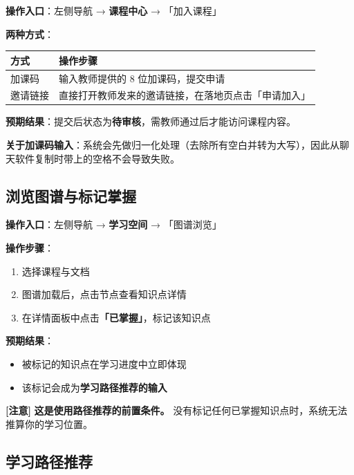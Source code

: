 \documentclass[UTF8,a4paper,11pt]{ctexrep}
\newcommand{\warnmark}{\textcolor{todobar}{\textbf{[注意]}}}
\begin{document}
\textbf{操作入口}：左侧导航 → \textbf{课程中心} → 「加入课程」

\textbf{两种方式}：

\begin{center}
\small
\begin{tabularx}{\linewidth}{@{}XX@{}}
\toprule
方式 & 操作步骤 \\
\midrule
加课码 & 输入教师提供的 8 位加课码，提交申请 \\
邀请链接 & 直接打开教师发来的邀请链接，在落地页点击「申请加入」 \\
\bottomrule
\end{tabularx}
\end{center}
\textbf{预期结果}：提交后状态为\textbf{待审核}，需教师通过后才能访问课程内容。

\begin{notebox}
\textbf{关于加课码输入}：系统会先做归一化处理（去除所有空白并转为大写），因此从聊天软件复制时带上的空格不会导致失败。

\end{notebox}


\subsection{浏览图谱与标记掌握}

\textbf{操作入口}：左侧导航 → \textbf{学习空间} → 「图谱浏览」

\textbf{操作步骤}：

\begin{enumerate}
\item 选择课程与文档
\item 图谱加载后，点击节点查看知识点详情
\item 在详情面板中点击\textbf{「已掌握」}，标记该知识点
\end{enumerate}
\textbf{预期结果}：

\begin{itemize}
\item 被标记的知识点在学习进度中立即体现
\item 该标记会成为\textbf{学习路径推荐的输入}
\end{itemize}
\begin{todobox}
\warnmark{} \textbf{这是使用路径推荐的前置条件。} 没有标记任何已掌握知识点时，系统无法推算你的学习位置。

\end{todobox}


\subsection{学习路径推荐}
\end{document}
